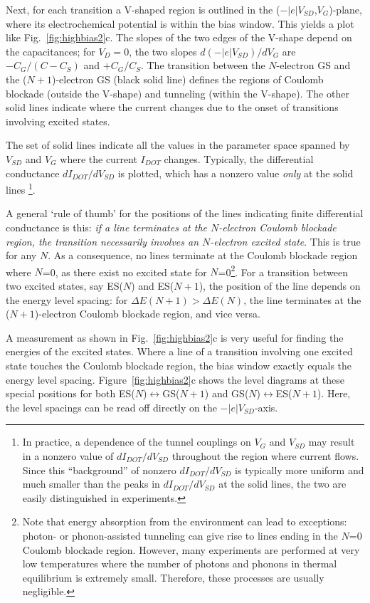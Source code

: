 \documentclass[12pt,aps,nofootinbib]{revtex4-1}
\begin{document}
Next, for each transition a V-shaped region is outlined in the
($-\left|e\right|V_{SD}$,${V_G}$)-plane, where its electrochemical
potential is within the bias window. This yields a plot like
Fig.~\ref{fig:highbias2}c. The slopes of the two edges of the
V-shape depend on the capacitances; for $V_D=0$, the two slopes
$d(-\left|e\right|V_{SD})/d{V_G}$ are $-C_G/(C\!-\!C_S)$ and
$+C_G/C_S$. The transition between the $N$-electron GS and the
($N\!+\!1$)-electron GS (black solid line) defines the regions of
Coulomb blockade (outside the V-shape) and tunneling (within the
V-shape). The other solid lines indicate where the current changes
due to the onset of transitions involving excited states. 

The set of solid lines indicate all the values in the parameter space spanned by $V_{SD}$ and ${V_G}$ where the current $I_{DOT}$ changes. Typically, the differential conductance $dI_{DOT}/dV_{SD}$ is plotted, which has a nonzero value \textit{only} at the solid lines \footnote{In practice, a dependence of the tunnel couplings on $V_G$ and $V_{SD}$ may result in a nonzero value of $dI_{DOT}/dV_{SD}$ throughout the region where current flows. Since this ``background'' of nonzero $dI_{DOT}/dV_{SD}$ is typically more uniform and much smaller than the peaks in $dI_{DOT}/dV_{SD}$ at the solid lines, the two are easily distinguished in experiments.}.

A general `rule of thumb' for the positions of the lines indicating finite differential conductance is this: \textit{if a line terminates at
the $N$-electron Coulomb blockade region, the transition
necessarily involves an $N$-electron excited state}. This is true
for any $N$. As a consequence, no lines terminate at the Coulomb
blockade region where $N$=0, as there exist no excited state for
$N$=0\footnote{Note that energy absorption from the environment
can lead to exceptions: photon- or phonon-assisted tunneling can
give rise to lines ending in the $N$=0 Coulomb blockade region.
However, many experiments are performed at very low temperatures
where the number of photons and phonons in thermal equilibrium is
extremely small. Therefore, these processes are usually
negligible.}. For a transition between two excited states, say
ES($N$) and ES($N\!+\!1$), the position of the line depends on the
energy level spacing: for $\Delta E(N\!+\!1)>\Delta E(N)$, the
line terminates at the ($N\!+\!1$)-electron Coulomb blockade
region, and vice versa.

A measurement as shown in Fig.~\ref{fig:highbias2}c is very useful
for finding the energies of the excited states. Where a line of a
transition involving one excited state touches the Coulomb
blockade region, the bias window exactly equals the energy level
spacing. Figure~\ref{fig:highbias2}c shows the level diagrams at
these special positions for both
ES($N$)$\leftrightarrow$GS($N\!+\!1$) and
GS($N$)$\leftrightarrow$ES($N\!+\!1$). Here, the level spacings
can be read off directly on the $-\left|e\right|V_{SD}$-axis.
\end{document}
